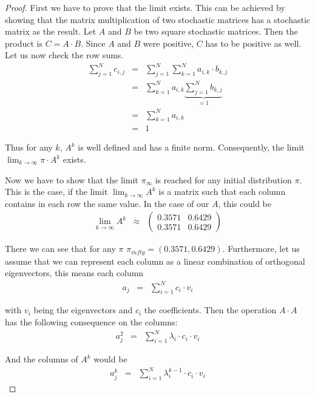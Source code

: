 \documentclass[a4paper, 12pt, titlepage]{article}
\begin{document}
\begin{proof}
First we have to prove that the limit exists.
This can be achieved by showing that the matrix multiplication of two stochastic matrices has a stochastic matrix as the result.
Let $A$ and $B$ be two square stochastic matrices.
Then the product is $C = A \cdot B$.
Since $A$ and $B$ were positive, $C$ has to be positive as well.
Let us now check the row sums.
\begin{eqnarray*}
	\sum_{j=1}^N c_{i,j} &=& \sum_{j=1}^N \sum_{k=1}^N a_{i,k}\cdot b_{k,j}\\
	&=& \sum_{k=1}^N a_{i,k} \underbrace{\sum_{j=1}^N b_{k,j}}_{=1}\\
	&=& \sum_{k=1}^N a_{i,k}\\
	&=& 1
\end{eqnarray*}

Thus for any $k$, $A^k$ is well defined and has a finite norm.
Consequently, the limit $\lim_{k\rightarrow \infty} \pi \cdot A^k$ exists.

Now we have to show that the limit $\pi_{\infty}$ is reached for any initial distribution $\pi$.
This is the case, if the limit $\lim_{k\rightarrow \infty} A^k$ is a matrix such that each column contains in each row the same value.
In the case of our $A$, this could be
\begin{eqnarray*}
	\lim_{k\rightarrow \infty} A^k &\approx& \begin{pmatrix}
  0.3571 & 0.6429 \\
  0.3571 & 0.6429
 \end{pmatrix}
\end{eqnarray*}

There we can see that for any $\pi$ $\pi_{infty} = (0.3571,0.6429)$.
Furthermore, let us assume that we can represent each column as a linear combination of orthogonal eigenvectors, this means each column 
\begin{eqnarray*}
	a_j &=& \sum_{i=1}^N c_i\cdot v_i
\end{eqnarray*}

with $v_i$ being the eigenvectors and $c_i$ the coefficients.
Then the operation $A\cdot A$ has the following consequence on the columns:
\begin{eqnarray*}
	a_j^2 &=& \sum_{i=1}^N \lambda_i \cdot c_i \cdot v_i
\end{eqnarray*}

And the columns of $A^k$ would be
\begin{eqnarray*}
	a_j^k &=& \sum_{i=1}^N \lambda_i^{k-1} \cdot c_i \cdot v_i
\end{eqnarray*}


\end{proof}
\end{document}
